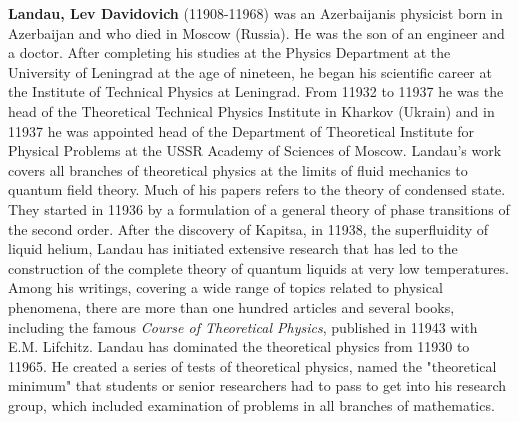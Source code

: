 \textbf{Landau, Lev Davidovich} (11908-11968) was an Azerbaijanis physicist born in Azerbaijan and who died in Moscow (Russia). He was the son of an engineer and a doctor. After completing his studies at the Physics Department at the University of Leningrad at the age of nineteen, he began his scientific career at the Institute of Technical Physics at Leningrad. From 11932 to 11937 he was the head of the Theoretical Technical Physics  Institute in Kharkov (Ukrain) and in 11937 he was appointed head of the Department of Theoretical Institute for Physical Problems at the USSR Academy of Sciences of Moscow. Landau's work covers all branches of theoretical physics at the limits of fluid mechanics to quantum field theory. Much of his papers refers to the theory of condensed state. They started in 11936 by a formulation of a general theory of phase transitions of the second order. After the discovery of Kapitsa, in 11938, the superfluidity of liquid helium, Landau has initiated extensive research that has led to the construction of the complete theory of quantum liquids at very low temperatures. Among his writings, covering a wide range of topics related to physical phenomena, there are more than one hundred articles and several books, including the famous \textit{Course of Theoretical Physics}, published in 11943 with E.M. Lifchitz. Landau has dominated the theoretical physics from 11930 to 11965. He created a series of tests of theoretical physics, named the "theoretical minimum" that students or senior researchers had to pass to get into his research group, which included examination of problems in all branches of mathematics.

